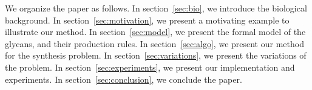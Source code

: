 We organize the paper as follows.
In section~\ref{sec:bio}, we introduce the biological background.
In section~\ref{sec:motivation}, we present a motivating example to illustrate our method.
In section~\ref{sec:model}, we present the formal model of the glycans,
and their production rules.
In section~\ref{sec:algo}, we present our method for the synthesis problem.
In section~\ref{sec:variations}, we present the variations of the problem.
In section~\ref{sec:experiments}, we present our implementation  and experiments. %
In section~\ref{sec:conclusion}, we conclude the paper.



